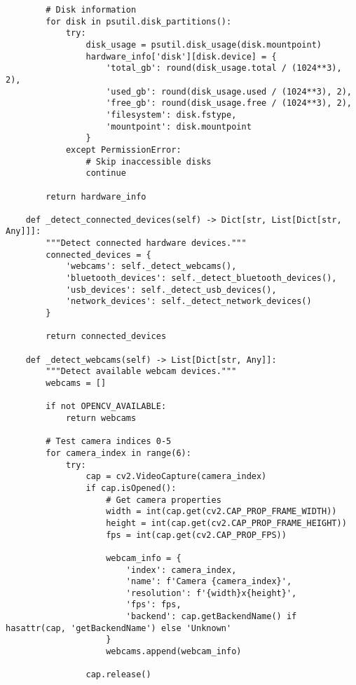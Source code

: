 \documentclass[12pt,a4paper]{article}
\begin{document}
\begin{verbatim}
        # Disk information
        for disk in psutil.disk_partitions():
            try:
                disk_usage = psutil.disk_usage(disk.mountpoint)
                hardware_info['disk'][disk.device] = {
                    'total_gb': round(disk_usage.total / (1024**3), 2),
                    'used_gb': round(disk_usage.used / (1024**3), 2),
                    'free_gb': round(disk_usage.free / (1024**3), 2),
                    'filesystem': disk.fstype,
                    'mountpoint': disk.mountpoint
                }
            except PermissionError:
                # Skip inaccessible disks
                continue
        
        return hardware_info
    
    def _detect_connected_devices(self) -> Dict[str, List[Dict[str, Any]]]:
        """Detect connected hardware devices."""
        connected_devices = {
            'webcams': self._detect_webcams(),
            'bluetooth_devices': self._detect_bluetooth_devices(),
            'usb_devices': self._detect_usb_devices(),
            'network_devices': self._detect_network_devices()
        }
        
        return connected_devices
    
    def _detect_webcams(self) -> List[Dict[str, Any]]:
        """Detect available webcam devices."""
        webcams = []
        
        if not OPENCV_AVAILABLE:
            return webcams
        
        # Test camera indices 0-5
        for camera_index in range(6):
            try:
                cap = cv2.VideoCapture(camera_index)
                if cap.isOpened():
                    # Get camera properties
                    width = int(cap.get(cv2.CAP_PROP_FRAME_WIDTH))
                    height = int(cap.get(cv2.CAP_PROP_FRAME_HEIGHT))
                    fps = int(cap.get(cv2.CAP_PROP_FPS))
                    
                    webcam_info = {
                        'index': camera_index,
                        'name': f'Camera {camera_index}',
                        'resolution': f'{width}x{height}',
                        'fps': fps,
                        'backend': cap.getBackendName() if hasattr(cap, 'getBackendName') else 'Unknown'
                    }
                    webcams.append(webcam_info)
                    
                cap.release()
                

\end{verbatim}
\end{document}
